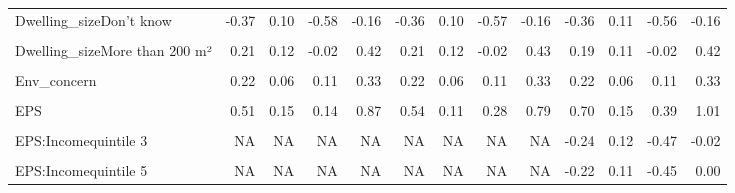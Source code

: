 \begin{table}
\begin{tabular}[t]{lrrrrrrrrrrrr}
Dwelling\_sizeDon't know & -0.37 & 0.10 & -0.58 & -0.16 & -0.36 & 0.10 & -0.57 & -0.16 & -0.36 & 0.11 & -0.56 & -0.16\\
\cellcolor{gray!10}{Dwelling\_sizeLess than 25 m²} & \cellcolor{gray!10}{-0.42} & \cellcolor{gray!10}{0.24} & \cellcolor{gray!10}{-0.90} & \cellcolor{gray!10}{0.05} & \cellcolor{gray!10}{-0.42} & \cellcolor{gray!10}{0.24} & \cellcolor{gray!10}{-0.91} & \cellcolor{gray!10}{0.03} & \cellcolor{gray!10}{-0.42} & \cellcolor{gray!10}{0.24} & \cellcolor{gray!10}{-0.92} & \cellcolor{gray!10}{0.03}\\
Dwelling\_sizeMore than 200 m² & 0.21 & 0.12 & -0.02 & 0.42 & 0.21 & 0.12 & -0.02 & 0.43 & 0.19 & 0.11 & -0.02 & 0.42\\
\addlinespace
\cellcolor{gray!10}{Rural} & \cellcolor{gray!10}{0.11} & \cellcolor{gray!10}{0.06} & \cellcolor{gray!10}{-0.01} & \cellcolor{gray!10}{0.23} & \cellcolor{gray!10}{0.11} & \cellcolor{gray!10}{0.06} & \cellcolor{gray!10}{-0.01} & \cellcolor{gray!10}{0.22} & \cellcolor{gray!10}{0.11} & \cellcolor{gray!10}{0.06} & \cellcolor{gray!10}{-0.01} & \cellcolor{gray!10}{0.23}\\
Env\_concern & 0.22 & 0.06 & 0.11 & 0.33 & 0.22 & 0.06 & 0.11 & 0.33 & 0.22 & 0.06 & 0.11 & 0.33\\
\cellcolor{gray!10}{Gov\_support} & \cellcolor{gray!10}{10.33} & \cellcolor{gray!10}{2.57} & \cellcolor{gray!10}{7.03} & \cellcolor{gray!10}{17.94} & \cellcolor{gray!10}{10.24} & \cellcolor{gray!10}{2.43} & \cellcolor{gray!10}{6.97} & \cellcolor{gray!10}{17.19} & \cellcolor{gray!10}{10.27} & \cellcolor{gray!10}{2.49} & \cellcolor{gray!10}{7.10} & \cellcolor{gray!10}{17.53}\\
EPS & 0.51 & 0.15 & 0.14 & 0.87 & 0.54 & 0.11 & 0.28 & 0.79 & 0.70 & 0.15 & 0.39 & 1.01\\
\cellcolor{gray!10}{EPS:Incomequintile 2} & \cellcolor{gray!10}{NA} & \cellcolor{gray!10}{NA} & \cellcolor{gray!10}{NA} & \cellcolor{gray!10}{NA} & \cellcolor{gray!10}{NA} & \cellcolor{gray!10}{NA} & \cellcolor{gray!10}{NA} & \cellcolor{gray!10}{NA} & \cellcolor{gray!10}{-0.03} & \cellcolor{gray!10}{0.12} & \cellcolor{gray!10}{-0.25} & \cellcolor{gray!10}{0.20}\\
\addlinespace
EPS:Incomequintile 3 & NA & NA & NA & NA & NA & NA & NA & NA & -0.24 & 0.12 & -0.47 & -0.02\\
\cellcolor{gray!10}{EPS:Incomequintile 4} & \cellcolor{gray!10}{NA} & \cellcolor{gray!10}{NA} & \cellcolor{gray!10}{NA} & \cellcolor{gray!10}{NA} & \cellcolor{gray!10}{NA} & \cellcolor{gray!10}{NA} & \cellcolor{gray!10}{NA} & \cellcolor{gray!10}{NA} & \cellcolor{gray!10}{-0.24} & \cellcolor{gray!10}{0.11} & \cellcolor{gray!10}{-0.47} & \cellcolor{gray!10}{-0.02}\\
EPS:Incomequintile 5 & NA & NA & NA & NA & NA & NA & NA & NA & -0.22 & 0.11 & -0.45 & 0.00\\
\bottomrule
\end{tabular}
\end{table}

